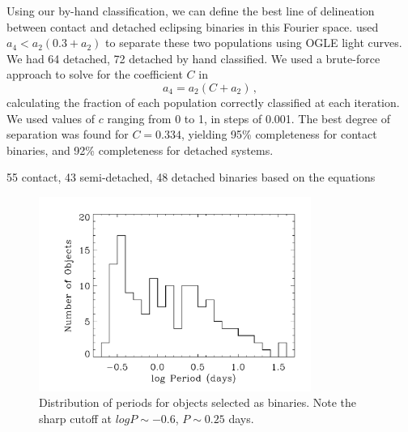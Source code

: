 \documentclass[]{emulateapj}
\begin{document}
Using our by-hand classification, we can define the best line of delineation between contact and detached eclipsing binaries in this Fourier space. \citet{rucinski1997b} used $a_4< a_2(0.3 + a_2)$ to separate these two populations using OGLE light curves. We had 64 detached, 72 detached by hand classified. We used a brute-force approach to solve for the coefficient $C$ in 
\begin{equation}
a_4 = a_2(C + a_2)\,,
\end{equation}
calculating the fraction of each population correctly classified at each iteration. We used values of $c$ ranging from 0 to 1, in steps of 0.001. The best degree of separation was found for $C=0.334$, yielding 95\% completeness for contact binaries, and 92\% completeness for detached systems.




55 contact, 43 semi-detached, 48 detached binaries based on the equations

\begin{figure}[]
\centering
\includegraphics[width=3.5in]{new_plots/bb_perhist}
\caption{Distribution of periods for objects selected as binaries. Note the sharp cutoff at $log P \sim -0.6$, $P \sim 0.25$ days.}
\label{perhist}
\end{figure}
\end{document}
